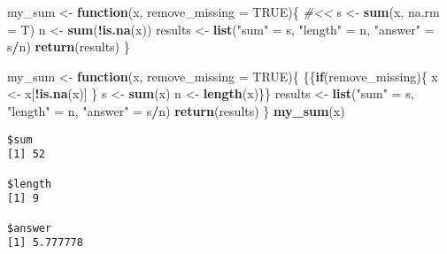 \documentclass[12pt,letterpaperpaper,openany]{book}
\newenvironment{Shaded}{\begin{snugshade}}{\end{snugshade}}
\newcommand{\CommentTok}[1]{\textcolor[rgb]{0.56,0.35,0.01}{\textit{#1}}}
\newcommand{\ControlFlowTok}[1]{\textcolor[rgb]{0.13,0.29,0.53}{\textbf{#1}}}
\newcommand{\DataTypeTok}[1]{\textcolor[rgb]{0.13,0.29,0.53}{#1}}
\newcommand{\KeywordTok}[1]{\textcolor[rgb]{0.13,0.29,0.53}{\textbf{#1}}}
\newcommand{\NormalTok}[1]{#1}
\newcommand{\OperatorTok}[1]{\textcolor[rgb]{0.81,0.36,0.00}{\textbf{#1}}}
\newcommand{\OtherTok}[1]{\textcolor[rgb]{0.56,0.35,0.01}{#1}}
\newcommand{\StringTok}[1]{\textcolor[rgb]{0.31,0.60,0.02}{#1}}
\begin{document}
\begin{Shaded}
\begin{Highlighting}[]
\NormalTok{my_sum <-}\StringTok{ }\ControlFlowTok{function}\NormalTok{(x, }\DataTypeTok{remove_missing =} \OtherTok{TRUE}\NormalTok{)\{ }\CommentTok{#<<}
\NormalTok{  s <-}\StringTok{ }\KeywordTok{sum}\NormalTok{(x, }\DataTypeTok{na.rm =}\NormalTok{ T)}
\NormalTok{  n <-}\StringTok{ }\KeywordTok{sum}\NormalTok{(}\OperatorTok{!}\KeywordTok{is.na}\NormalTok{(x)) }
\NormalTok{  results <-}\StringTok{ }\KeywordTok{list}\NormalTok{(}\StringTok{"sum"}\NormalTok{ =}\StringTok{ }\NormalTok{s, }\StringTok{"length"}\NormalTok{ =}\StringTok{ }\NormalTok{n, }\StringTok{"answer"}\NormalTok{ =}\StringTok{ }\NormalTok{s}\OperatorTok{/}\NormalTok{n)}
  \KeywordTok{return}\NormalTok{(results) }
\NormalTok{\}}
\end{Highlighting}
\end{Shaded}

\begin{Shaded}
\begin{Highlighting}[]
\NormalTok{my_sum <-}\StringTok{ }\ControlFlowTok{function}\NormalTok{(x, }\DataTypeTok{remove_missing =} \OtherTok{TRUE}\NormalTok{)\{ }
\NormalTok{  \{\{}\ControlFlowTok{if}\NormalTok{(remove_missing)\{}
\NormalTok{    x <-}\StringTok{ }\NormalTok{x[}\OperatorTok{!}\KeywordTok{is.na}\NormalTok{(x)]}
\NormalTok{  \}}
\NormalTok{  s <-}\StringTok{ }\KeywordTok{sum}\NormalTok{(x)}
\NormalTok{  n <-}\StringTok{ }\KeywordTok{length}\NormalTok{(x)\}\}}
\NormalTok{  results <-}\StringTok{ }\KeywordTok{list}\NormalTok{(}\StringTok{"sum"}\NormalTok{ =}\StringTok{ }\NormalTok{s, }\StringTok{"length"}\NormalTok{ =}\StringTok{ }\NormalTok{n, }\StringTok{"answer"}\NormalTok{ =}\StringTok{ }\NormalTok{s}\OperatorTok{/}\NormalTok{n)}
  \KeywordTok{return}\NormalTok{(results) }
\NormalTok{\}}
\KeywordTok{my_sum}\NormalTok{(x)}
\end{Highlighting}
\end{Shaded}

\begin{verbatim}
$sum
[1] 52

$length
[1] 9

$answer
[1] 5.777778
\end{verbatim}
\end{document}
